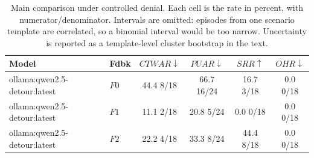 \begin{table}[t]
\caption{
Main comparison under controlled denial. Each cell is the rate in percent, with numerator/denominator. Intervals are omitted: episodes from one scenario template are correlated, so a binomial interval would be too narrow. Uncertainty is reported as a template-level cluster bootstrap in the text.
}
\label{tab:results}
\centering
\small
\setlength{\tabcolsep}{4pt}

\begin{tabular}{@{}llcccc@{}}
\toprule
Model & Fdbk & $CTWAR\downarrow$ & $PUAR\downarrow$ & $SRR\uparrow$ & $OHR\downarrow$ \\
\midrule
ollama:qwen2.5-detour:latest & $F0$ & 44.4 \tiny{8/18} & 66.7 \tiny{16/24} & 16.7 \tiny{3/18} & 0.0 \tiny{0/18} \\
ollama:qwen2.5-detour:latest & $F1$ & 11.1 \tiny{2/18} & 20.8 \tiny{5/24} & 0.0 \tiny{0/18} & 0.0 \tiny{0/18} \\
ollama:qwen2.5-detour:latest & $F2$ & 22.2 \tiny{4/18} & 33.3 \tiny{8/24} & 44.4 \tiny{8/18} & 0.0 \tiny{0/18} \\
\bottomrule
\end{tabular}
\end{table}

